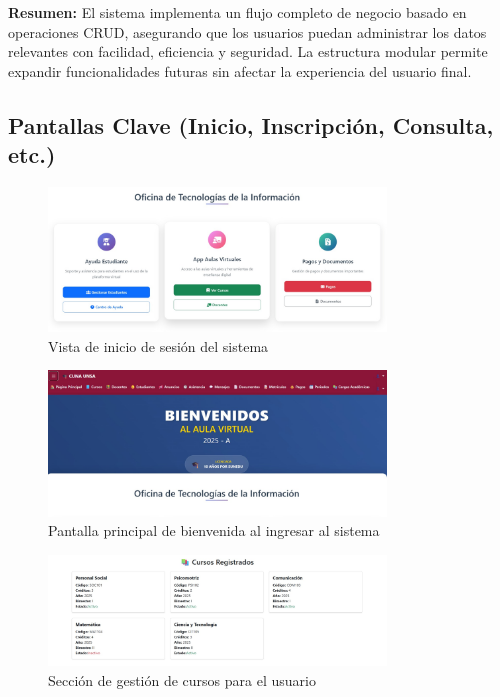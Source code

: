 \documentclass{article}
\begin{document}
\textbf{Resumen:} El sistema implementa un flujo completo de negocio basado en operaciones CRUD, asegurando que los usuarios puedan administrar los datos relevantes con facilidad, eficiencia y seguridad. La estructura modular permite expandir funcionalidades futuras sin afectar la experiencia del usuario final.


    \subsection{Pantallas Clave (Inicio, Inscripción, Consulta, etc.)}
        \begin{figure}[H]
    \centering
    \includegraphics[width=0.8\textwidth]{images/login.jpeg}
    \caption{Vista de inicio de sesión del sistema}
\end{figure}

\begin{figure}[H]
    \centering
    \includegraphics[width=0.8\textwidth]{images/welcome.jpeg}
    \caption{Pantalla principal de bienvenida al ingresar al sistema}
\end{figure}

\begin{figure}[H]
    \centering
    \includegraphics[width=0.8\textwidth]{images/cursos.jpeg}
    \caption{Sección de gestión de cursos para el usuario}
\end{figure}
\end{document}
